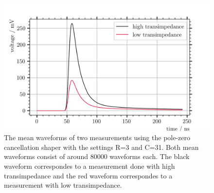 \begin{figure}
	\centering
	\includegraphics[width=1.\textwidth]{pictures/low_imp_mean_wf_pz}
	\caption[Waveforms measured with low and high transimpedance]{The mean waveforms of two measurements using the pole-zero cancellation shaper with the settings R=3 and C=31. Both mean waveforms consist of around \num{80000} waveforms each. The black waveform correspondes to a measurement done with high transimpedance and the red waveform correspondes to a measurement with low transimpedance.}
	\label{fig:low_imp_wf_pz}
\end{figure}


